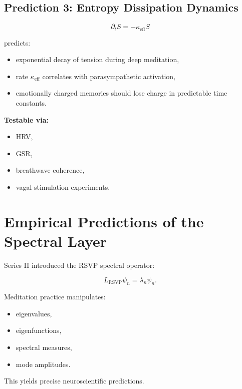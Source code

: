 \documentclass[12pt]{article}
\begin{document}
\section{Prediction 3: Entropy Dissipation Dynamics}

\[
\partial_t S = -\kappa_{\mathrm{eff}} S
\]

predicts:

\begin{itemize}
\item exponential decay of tension during deep meditation,
\item rate $\kappa_{\mathrm{eff}}$ correlates with parasympathetic activation,
\item emotionally charged memories should lose charge in predictable time constants.
\end{itemize}


\textbf{Testable via:}

\begin{itemize}
    \item HRV,
    \item GSR,
    \item breathwave coherence,
    \item vagal stimulation experiments.
\end{itemize}

\newpage


\chapter{Empirical Predictions of the Spectral Layer}

Series II introduced the RSVP spectral operator:

\[
L_{\text{RSVP}}\psi_n = \lambda_n \psi_n.
\]

Meditation practice manipulates:

\begin{itemize}
\item eigenvalues,
\item eigenfunctions,
\item spectral measures,
\item mode amplitudes.
\end{itemize}

This yields precise neuroscientific predictions.
\end{document}
